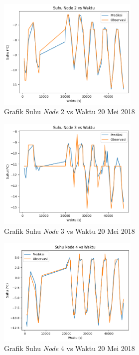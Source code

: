 \begin{figure}[H]
\setlength{}
\begin{center}
\includegraphics[width=0.6\textwidth]{fig/node2_temp_2018-05-20.png}
\caption{Grafik Suhu \textit{Node} 2 vs Waktu 20 Mei 2018}
\label{fig:node220}
\end{center}
\end{figure}

\begin{figure}[H]
\setlength{}
\begin{center}
\includegraphics[width=0.6\textwidth]{fig/node3_temp_2018-05-20.png}
\caption{Grafik Suhu \textit{Node} 3 vs Waktu 20 Mei 2018}
\label{fig:node320}
\end{center}
\end{figure}

\begin{figure}[H]
\setlength{}
\begin{center}
\includegraphics[width=0.6\textwidth]{fig/node4_temp_2018-05-20.png}
\caption{Grafik Suhu \textit{Node} 4 vs Waktu 20 Mei 2018}
\label{fig:node420}
\end{center}
\end{figure}

